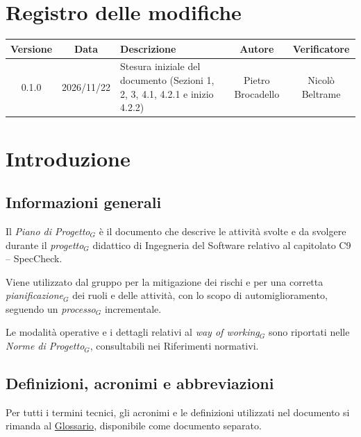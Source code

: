 \documentclass[a4paper, 11pt]{article}
\newcommand{\term}[1]{\textit{#1}$_G$} %
\begin{document}
\vspace{0.5cm}

\section*{Registro delle modifiche}
\renewcommand{\arraystretch}{1.25}
\begin{tabularx}{\textwidth}{|c|c|X|c|c|}
    \hline
    \textbf{Versione} & \textbf{Data} & \textbf{Descrizione} & \textbf{Autore} & \textbf{Verificatore} \\ \hline
    0.1.0 & 2026/11/22 & Stesura iniziale del documento (Sezioni 1, 2, 3, 4.1, 4.2.1 e inizio 4.2.2) & Pietro Brocadello & Nicolò Beltrame\\ \hline
\end{tabularx}

\newpage
\tableofcontents
\newpage
\listoftables
\newpage

\section{Introduzione}

\subsection{Informazioni generali}
Il \term{Piano di Progetto} è il documento che descrive le attività svolte e da svolgere durante il \term{progetto} didattico di Ingegneria del Software relativo al capitolato C9 -- SpecCheck.

Viene utilizzato dal gruppo per la mitigazione dei rischi e per una corretta \term{pianificazione} dei ruoli e delle attività, con lo scopo di automiglioramento, seguendo un \term{processo} incrementale.

Le modalità operative e i dettagli relativi al \term{way of working} sono riportati nelle \term{Norme di Progetto}, consultabili nei Riferimenti normativi.

\subsection{Definizioni, acronimi e abbreviazioni}
Per tutti i termini tecnici, gli acronimi e le definizioni utilizzati nel documento si rimanda al \href{https://0x06tudio.github.io/docs/html/glossario.html}{Glossario}, disponibile come documento separato.
\end{document}
